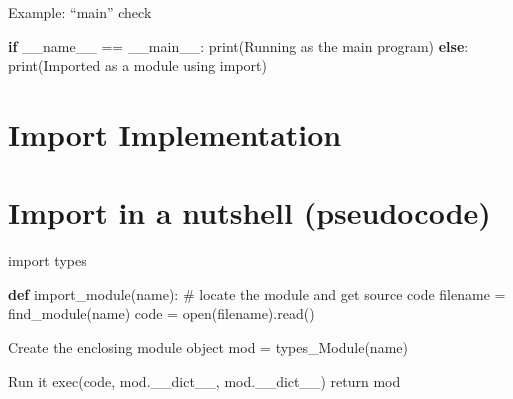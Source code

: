 \documentclass[
  letterpaper,
  DIV=11,
  numbers=noendperiod]{scrreprt}
\newenvironment{Shaded}{\begin{snugshade}}{\end{snugshade}}
\newcommand{\BuiltInTok}[1]{\textcolor[rgb]{0.00,0.23,0.31}{#1}}
\newcommand{\CommentTok}[1]{\textcolor[rgb]{0.37,0.37,0.37}{#1}}
\newcommand{\ControlFlowTok}[1]{\textcolor[rgb]{0.00,0.23,0.31}{\textbf{#1}}}
\newcommand{\KeywordTok}[1]{\textcolor[rgb]{0.00,0.23,0.31}{\textbf{#1}}}
\newcommand{\NormalTok}[1]{\textcolor[rgb]{0.00,0.23,0.31}{#1}}
\newcommand{\OperatorTok}[1]{\textcolor[rgb]{0.37,0.37,0.37}{#1}}
\newcommand{\StringTok}[1]{\textcolor[rgb]{0.13,0.47,0.30}{#1}}
\newcommand{\VariableTok}[1]{\textcolor[rgb]{0.07,0.07,0.07}{#1}}
\begin{document}
Example: ``main'' check

\begin{Shaded}
\begin{Highlighting}[]
\ControlFlowTok{if} \VariableTok{\_\_name\_\_} \OperatorTok{==} \StringTok{\textquotesingle{}\_\_main\_\_\textquotesingle{}}\NormalTok{:}
    \BuiltInTok{print}\NormalTok{(}\StringTok{\textquotesingle{}Running as the main program\textquotesingle{}}\NormalTok{)}
\ControlFlowTok{else}\NormalTok{:}
    \BuiltInTok{print}\NormalTok{(}\StringTok{\textquotesingle{}Imported as a module using import\textquotesingle{}}\NormalTok{) }
\end{Highlighting}
\end{Shaded}


\chapter{Import Implementation}\label{import-implementation}


\chapter{Import in a nutshell
(pseudocode)}\label{import-in-a-nutshell-pseudocode}

import types

\begin{Shaded}
\begin{Highlighting}[]
\KeywordTok{def}\NormalTok{ import\_module(name):}
    \CommentTok{\# locate the module and get source code}
\NormalTok{    filename }\OperatorTok{=}\NormalTok{ find\_module(name)}
\NormalTok{    code }\OperatorTok{=} \BuiltInTok{open}\NormalTok{(filename).read() }
\end{Highlighting}
\end{Shaded}

\begin{Shaded}
\begin{Highlighting}[]
\NormalTok{Create the enclosing module object mod = types\_Module(name) }
\end{Highlighting}
\end{Shaded}

\begin{Shaded}
\begin{Highlighting}[]
\NormalTok{Run it exec(code, mod.\_\_dict\_\_, mod.\_\_dict\_\_) return mod }
\end{Highlighting}
\end{Shaded}
\end{document}

